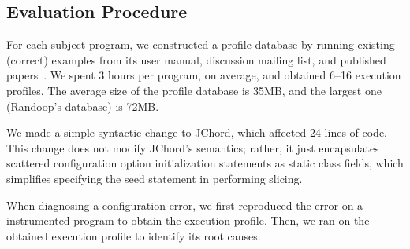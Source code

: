 

\vspace{-2mm}
\subsection{Evaluation Procedure}
\vspace{-1mm}

For each subject program, we constructed a profile database
by running existing (correct) examples from its user manual, discussion
mailing list, and published papers~\cite{PachecoLET2007, Rabkin:2011:PPC}.
We spent 3 hours per program, on average, and obtained 6--16 execution profiles.
The average size of the profile database is 35MB, and the largest one
(Randoop's database) is 72MB.

We made a simple syntactic change to JChord, which affected 24 
lines of code. This change
does not modify JChord's semantics; rather, it just encapsulates
scattered configuration option initialization statements 
as static class fields, which simplifies specifying the seed statement
in performing slicing. 





When diagnosing a configuration error, we first reproduced the
error on a \ourtool-instrumented program to obtain the
execution profile. Then, we ran \ourtool on the obtained execution profile
to identify its root causes.

